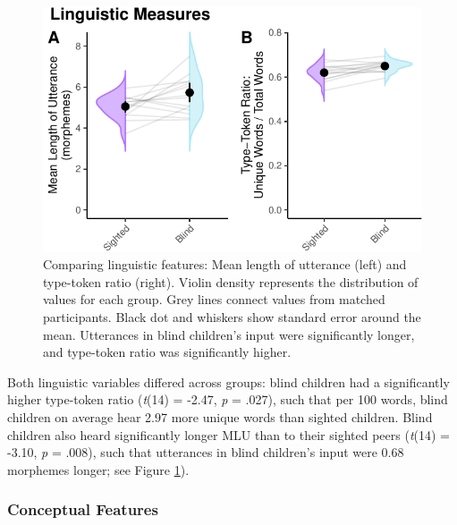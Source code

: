 \documentclass[
  man]{apa6}
\begin{document}
\begin{figure}
\centering
\includegraphics{input_quality_manuscript_files/figure-latex/linguistic-plots-1.pdf}
\caption{\label{fig:linguistic-plots}Comparing linguistic features: Mean length of utterance (left) and type-token ratio (right). Violin density represents the distribution of values for each group. Grey lines connect values from matched participants. Black dot and whiskers show standard error around the mean. Utterances in blind children's input were significantly longer, and type-token ratio was significantly higher.}
\end{figure}

Both linguistic variables differed across groups: blind children had a significantly higher type-token ratio (\emph{t}(14) = -2.47, \emph{p} = .027), such that per 100 words, blind children on average hear 2.97 more unique words than sighted children. Blind children also heard significantly longer MLU than to their sighted peers (\emph{t}(14) = -3.10, \emph{p} = .008), such that utterances in blind children's input were 0.68 morphemes longer; see Figure \ref{fig:linguistic-plots}).

\hypertarget{conceptual-features-1}{%
\subsubsection{Conceptual Features}\label{conceptual-features-1}}
\end{document}
